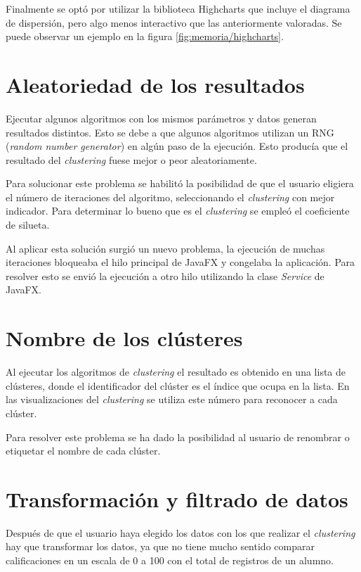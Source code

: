Finalmente se optó por utilizar la biblioteca Highcharts que incluye el diagrama de dispersión, pero algo menos interactivo que las anteriormente valoradas. Se puede observar un ejemplo en la figura \ref{fig:memoria/highcharts}.



\section{Aleatoriedad de los resultados}
Ejecutar algunos algoritmos con los mismos parámetros y datos generan resultados distintos. Esto se debe a que algunos algoritmos utilizan un RNG (\emph{random number generator}) en algún paso de la ejecución. Esto producía que el resultado del \emph{clustering} fuese mejor o peor aleatoriamente.

Para solucionar este problema se habilitó la posibilidad de que el usuario eligiera el número de iteraciones del algoritmo, seleccionando el \emph{clustering} con mejor indicador. Para determinar lo bueno que es el \emph{clustering} se empleó el coeficiente de silueta.

Al aplicar esta solución surgió un nuevo problema, la ejecución de muchas iteraciones bloqueaba el hilo principal de JavaFX y congelaba la aplicación. Para resolver esto se envió la ejecución a otro hilo utilizando la clase \emph{Service} de JavaFX.

\section{Nombre de los clústeres}
Al ejecutar los algoritmos de \emph{clustering} el resultado es obtenido en una lista de clústeres, donde el identificador del clúster es el índice que ocupa en la lista. En las visualizaciones del \emph{clustering} se utiliza este número para reconocer a cada clúster.

Para resolver este problema se ha dado la posibilidad al usuario de renombrar o etiquetar el nombre de cada clúster.

\section{Transformación y filtrado de datos}
Después de que el usuario haya elegido los datos con los que realizar el \emph{clustering} hay que transformar los datos, ya que no tiene mucho sentido comparar calificaciones en un escala de 0 a 100 con el total de registros de un alumno.

